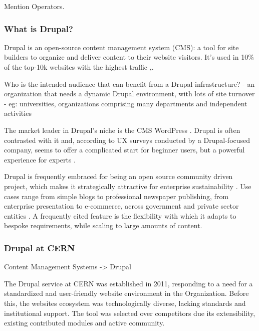 Mention Operators.

\subsubsection*{What is Drupal?}
\label{what-is-drupal}

Drupal is an open-source content management system (CMS): a tool for site builders to organize and deliver content to their website visitors.
It's used in 10\% of the top-10k websites with the highest traffic \cite{builtwith_pty_ltd_open_nodate},\cite{q-success_di_gelbmann_gmbh_wordpress_nodate}.

Who is the intended audience that can benefit from a Drupal infrastructure?
- an organization that needs a dynamic Drupal environment, with lots of site turnover
- eg: universities, organizations comprising many departments and independent activities

The market leader in Drupal's niche is the CMS WordPress \cite{builtwith_pty_ltd_open_nodate}.
Drupal is often contrasted with it and, according to UX surveys conducted by a Drupal-focused company, seems to offer a complicated start for beginner users,
but a powerful experience for experts \cite{buytaert_state_nodate}.

Drupal is frequently embraced for being an open source community driven project, which makes it strategically attractive for enterprise sustainability \cite{cern_geneva_real_2019}.
Use cases range from simple blogs to professional newspaper publishing, from enterprise presentation to e-commerce, across government and private sector entities \cite{drupal_community_explore_nodate}.
A frequently cited feature is the flexibility with which it adapts to bespoke requirements, while scaling to large amounts of content.

\subsubsection*{Drupal at CERN}
\label{drupal-at-cern}

Content Management Systems -> Drupal

The Drupal service at CERN was established in 2011, responding to a need for a standardized and user-friendly website environment in the Organization.
Before this, the websites ecosystem was technologically diverse, lacking standards and institutional support.
The tool was selected over competitors due its extensibility, existing contributed modules and active community.

